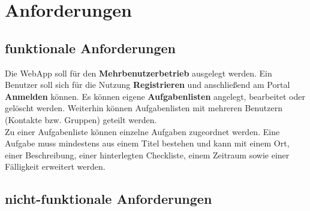 \section{Anforderungen}

\subsection{funktionale Anforderungen}

Die WebApp soll für den \textbf{Mehrbenutzerbetrieb} ausgelegt werden. Ein Benutzer soll sich für die Nutzung \textbf{Registrieren} und anschließend am Portal \textbf{Anmelden} können. Es können eigene \textbf{Aufgabenlisten} angelegt, bearbeitet oder gelöscht werden. Weiterhin können Aufgabenlisten mit mehreren Benutzern (Kontakte bzw. Gruppen) geteilt werden. \\

Zu einer Aufgabenliste können einzelne Aufgaben zugeordnet werden. Eine Aufgabe muss mindestens aus einem Titel bestehen und kann mit einem Ort, einer Beschreibung, einer hinterlegten Checkliste, einem Zeitraum sowie einer Fälligkeit erweitert werden.

\subsection{nicht-funktionale Anforderungen}
